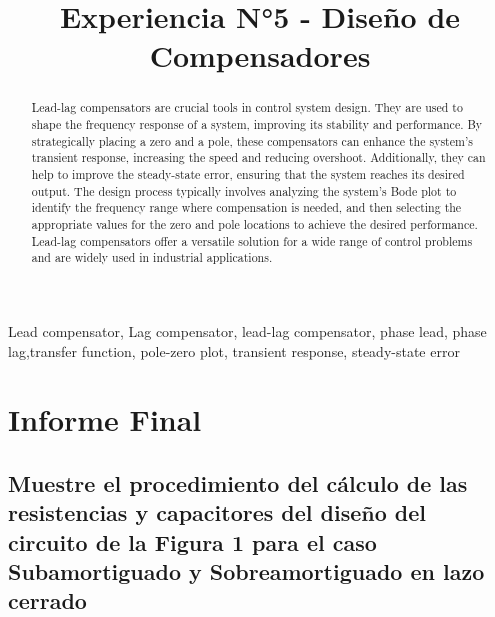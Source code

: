 \documentclass[conference]{IEEEtran}
\begin{document}
	
	\title{Experiencia N°5 - Diseño de Compensadores}
	
	\author{
		\and
		\and
	}
	\maketitle
	
	\begin{abstract}
		Lead-lag compensators are crucial tools in control system design. They are used to shape the frequency response of a system, improving its stability and performance. By strategically placing a zero and a pole, these compensators can enhance the system's transient response, increasing the speed and reducing overshoot. Additionally, they can help to improve the steady-state error, ensuring that the system reaches its desired output. The design process typically involves analyzing the system's Bode plot to identify the frequency range where compensation is needed, and then selecting the appropriate values for the zero and pole locations to achieve the desired performance. Lead-lag compensators offer a versatile solution for a wide range of control problems and are widely used in industrial applications.
	\end{abstract}
	
	\begin{IEEEkeywords}
		Lead compensator, Lag compensator, lead-lag compensator, phase lead, phase lag,transfer function, pole-zero plot, transient response, steady-state error
	\end{IEEEkeywords}
	\section{Informe Final}
	
	 \subsection{\textbf{Muestre el procedimiento del cálculo de las resistencias y capacitores del diseño del circuito de la Figura 1 para el caso Subamortiguado y Sobreamortiguado en lazo cerrado}}
	 
\end{document}
